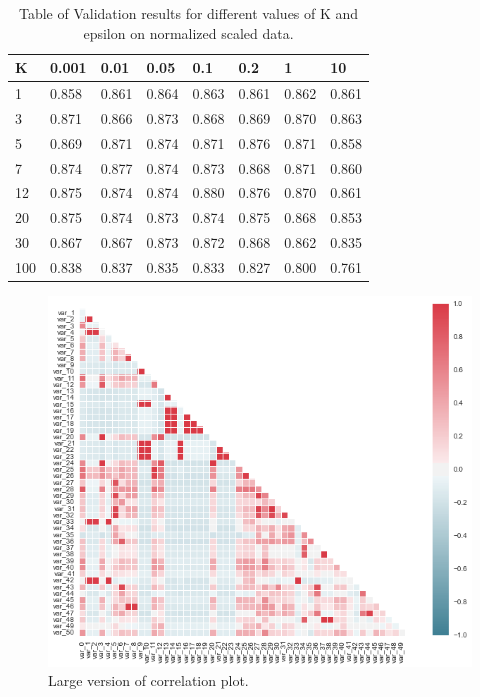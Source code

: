 \documentclass[letterpaper]{article}
\begin{document}
\begin{table}[h!]
\centering

\begin{tabular}{l|lllllll}
K   & 0.001 & 0.01  & 0.05  & 0.1   & 0.2   & 1     & 10\\\hline\hline %
1   & 0.858 & 0.861 & 0.864 & 0.863 & 0.861 & 0.862 & 0.861 \\
3   & 0.871 & 0.866 & 0.873 & 0.868 & 0.869 & 0.870 & 0.863 \\
5   & 0.869 & 0.871 & 0.874 & 0.871 & 0.876 & 0.871 & 0.858 \\
7   & 0.874 & 0.877 & 0.874 & 0.873 & 0.868 & 0.871 & 0.860 \\
12  & 0.875 & 0.874 & 0.874 & 0.880 & 0.876 & 0.870 & 0.861 \\
20  & 0.875 & 0.874 & 0.873 & 0.874 & 0.875 & 0.868 & 0.853 \\
30  & 0.867 & 0.867 & 0.873 & 0.872 & 0.868 & 0.862 & 0.835 \\
100 & 0.838 & 0.837 & 0.835 & 0.833 & 0.827 & 0.800 & 0.761
\end{tabular}
\caption{Table of Validation results for different values of K and epsilon on normalized scaled data.}
\label{tab:cross_validation_normalized}
\end{table}

\begin{figure}[h!]
\includegraphics[scale=0.9]{covariance}
\caption{Large version of correlation plot.}
\label{fig:correlation_plot_large}
\end{figure}
\end{document}
